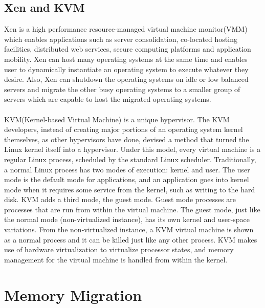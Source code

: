 \documentclass[runningheads]{llncs}
\begin{document}
\subsection{Xen and KVM}
Xen is a high performance resource-managed virtual machine monitor(VMM) which enables applications such as server consolidation, co-located hosting facilities, distributed web services, secure computing platforms and application mobility\cite{barham2003xen}. Xen can host many operating systems at the same time and enables user to dynamically instantiate an operating system to execute whatever they desire. Also, Xen can shutdown the operating systems on idle or low balanced servers and migrate the other busy operating systems to a smaller group of servers which are capable to host the migrated operating systems.
\\\\
KVM(Kernel-based Virtual Machine) is a unique hypervisor. The KVM developers, instead of creating major portions of an operating system kernel themselves, as other hypervisors have done, devised a method that turned the Linux kernel itself into a hypervisor\cite{irfan2008virtualization}. Under this model, every virtual machine is a regular Linux process, scheduled by the standard Linux scheduler. Traditionally, a normal Linux process has two modes of execution: kernel and user. The user mode is the default mode for applications, and an application goes into kernel mode when it requires some service from the kernel, such as writing to the hard disk. KVM adds a third mode, the guest mode. Guest mode processes are processes that are run from within the virtual machine. The guest mode, just like the normal mode (non-virtualized instance), has its own kernel and user-space variations. From the non-virtualized instance, a KVM virtual machine is shown as a normal process and it can be killed just like any other process. KVM makes use of hardware virtualization to virtualize processor states, and memory management for the virtual machine is handled from within the kernel.
\section{Memory Migration}
\end{document}
